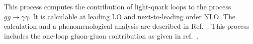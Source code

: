 This process computes the contribution of light-quark loops
to the process $gg \to \gamma\gamma$.  It is calculable at leading LO
and next-to-leading order NLO.
The calculation and a phenomenological analysis are described
in Ref.~\cite{Campbell:2016yrh}.
This process includes the one-loop gluon-gluon contribution as
given in ref.~\cite{Bern:2002jx}.

